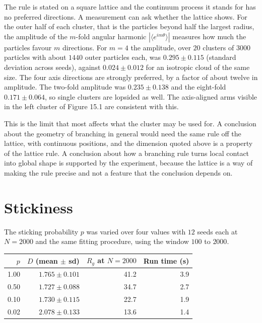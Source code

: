 The rule is stated on a square lattice and the continuum process it stands for has no preferred directions. A measurement can ask whether the lattice shows. For the outer half of each cluster, that is the particles beyond half the largest radius, the amplitude of the $m$-fold angular harmonic $|\langle e^{im\theta}\rangle|$ measures how much the particles favour $m$ directions. For $m=4$ the amplitude, over $20$ clusters of $3000$ particles with about $1440$ outer particles each, was $0.295\pm0.115$ (standard deviation across seeds), against $0.024\pm0.012$ for an isotropic cloud of the same size. The four axis directions are strongly preferred, by a factor of about twelve in amplitude. The two-fold amplitude was $0.235\pm0.138$ and the eight-fold $0.171\pm0.064$, so single clusters are lopsided as well. The axis-aligned arms visible in the left cluster of Figure 15.1 are consistent with this.

This is the limit that most affects what the cluster may be used for. A conclusion about the geometry of branching in general would need the same rule off the lattice, with continuous positions, and the dimension quoted above is a property of the lattice rule. A conclusion about how a branching rule turns local contact into global shape is supported by the experiment, because the lattice is a way of making the rule precise and not a feature that the conclusion depends on.

\section{Stickiness}

The sticking probability $p$ was varied over four values with $12$ seeds each at $N=2000$ and the same fitting procedure, using the window $100$ to $2000$.

\begin{center}
\begin{tabular}{rrrr}
\toprule
$p$ & $D$ (mean $\pm$ sd) & $R_g$ at $N=2000$ & Run time (s)\\
\midrule
1.00 & $1.765\pm0.101$ & 41.2 & 3.9\\
0.50 & $1.727\pm0.088$ & 34.7 & 2.7\\
0.10 & $1.730\pm0.115$ & 22.7 & 1.9\\
0.02 & $2.078\pm0.133$ & 13.6 & 1.4\\
\bottomrule
\end{tabular}
\end{center}

